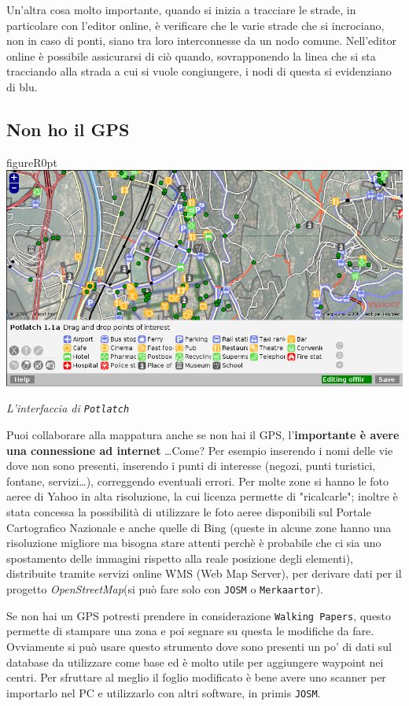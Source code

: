 \documentclass[a4paper,twoside,12pt,]{article}
\newcommand{\osm}{\emph{OpenStreetMap}\xspace}
\newcommand{\gps}{GPS\xspace}
\newcommand{\soft}[1]{\texttt{#1}}
\begin{document}
Un'altra cosa molto importante, quando si inizia a tracciare le strade, in particolare con l'editor online, è verificare che le varie strade che si incrociano, non in caso di ponti, siano tra loro interconnesse da un nodo comune. Nell'editor online è possibile assicurarsi di ciò quando, sovrapponendo la linea che si sta tracciando alla strada a cui si vuole congiungere, i nodi di questa si evidenziano di blu.
\subsection{Non ho il \gps}
\begin{wrapfloat}{figure}{R}{0pt}
 \includegraphics[width=0.7\columnwidth]{potlatch.png}
 \caption{\textit{L'interfaccia di \soft{Potlatch}}}
\end{wrapfloat}
Puoi collaborare alla mappatura anche se non hai il \gps, l'\textbf{importante è avere una connessione ad internet} \dots Come? Per esempio inserendo i nomi delle vie dove non sono presenti, inserendo i punti di interesse (negozi, punti turistici, fontane, servizi\dots), correggendo eventuali errori. Per molte zone si hanno le foto aeree di Yahoo in alta risoluzione, la cui licenza permette di "ricalcarle"; inoltre è stata concessa la possibilità di utilizzare le foto aeree disponibili sul Portale Cartografico Nazionale e anche quelle di Bing (queste in alcune zone hanno una risoluzione migliore ma bisogna stare attenti perchè è probabile che ci sia uno spostamento delle immagini rispetto alla reale posizione degli elementi), distribuite tramite servizi online WMS (Web Map Server), per derivare dati per il progetto \osm (si può fare solo con \soft{JOSM} o \soft{Merkaartor}). 

Se non hai un \gps potresti prendere in considerazione \soft{Walking Papers}, questo permette di stampare una zona e poi segnare su questa le modifiche da fare. Ovviamente si può usare questo strumento dove sono presenti un po' di dati sul database da utilizzare come base ed è molto utile per aggiungere waypoint nei centri. Per sfruttare al meglio il foglio modificato è bene avere uno scanner per importarlo nel PC e utilizzarlo con altri software, in primis \soft{JOSM}.
\end{document}
